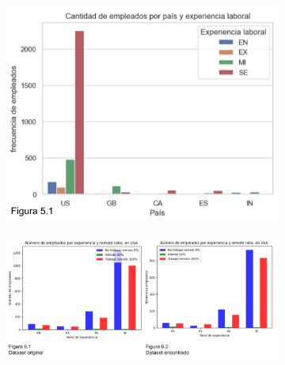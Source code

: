 \documentclass{article}
\begin{document}
	\begin{figure}[htbp] %
		\begin{subfigure}[b]{1.1\textwidth}
			\includegraphics[width=12cm]{FigurasTablas/figura5.1graficabarras.png}
			\label{figura 5.1 grafico de barras agrupado}
		\end{subfigure}
		
		\begin{subfigure}[b]{1.1\textwidth}
			\includegraphics[width=16cm]{FigurasTablas/figura6.1y6.2GraficoBarras.png}
			\label{figura6.1y6.2GraficoBarras}
		\end{subfigure}
	\end{figure}
\end{document}
